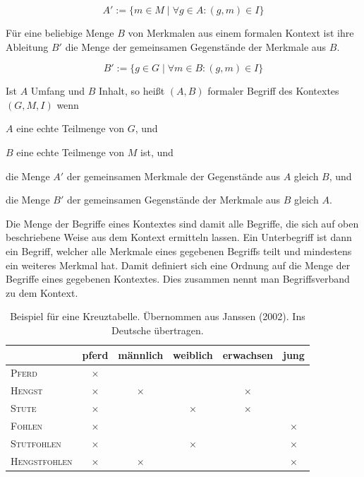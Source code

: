 \documentclass[pagesize,DIV=calc,12pt,final]{scrreprt}
\begin{document}
\begin{equation*}
A' := \lbrace m \in M \; \vert \; \forall g \in A: (g,m) \in I\rbrace
\end{equation*}

Für eine beliebige Menge $B$ von Merkmalen aus einem formalen Kontext ist ihre Ableitung $B'$ die Menge der gemeinsamen Gegenstände der Merkmale aus $B$. 

\begin{equation*}
B' := \lbrace g \in G \; \vert \; \forall m \in B: (g,m) \in I\rbrace
\end{equation*}

Ist $A$ Umfang und $B$ Inhalt, so heißt $(A,B)$ formaler Begriff des Kontextes $(G,M,I)$ wenn

\begin{inparaenum}
\item
 $A$ eine echte Teilmenge von $G$, und
\item
 $B$ eine echte Teilmenge von $M$ ist, und
\item
 die Menge $A'$ der gemeinsamen Merkmale der Gegenstände aus $A$ gleich
 $B$, und
\item
 die Menge $B'$ der gemeinsamen Gegenstände der Merkmale aus $B$ gleich
 $A$.
\end{inparaenum}

Die Menge der Begriffe eines Kontextes sind damit alle Begriffe, die sich auf oben beschriebene Weise aus dem Kontext ermitteln lassen. 
Ein Unterbegriff ist dann ein Begriff, welcher alle Merkmale eines gegebenen Begriffs teilt und mindestens ein weiteres Merkmal hat. 
Damit definiert sich eine Ordnung auf die Menge der Begriffe eines gegebenen Kontextes. 
Dies zusammen nennt man Begriffsverband zu dem Kontext. 

\begin{table}[ht]
\label{tab:janssen}
\centering
\renewcommand{\arraystretch}{2}
\begin{tabular}{@{}lccccc@{}}
\toprule
&
pferd &
männlich &
weiblich &
erwachsen &
jung\\
\midrule
\textsc{Pferd}	&	$\times$	&&&&\\

\textsc{Hengst}	&	$\times$	&	$\times$	&&	$\times$	&\\

\textsc{Stute}	&	$\times$	&&	$\times$	&	$\times$	&\\

\textsc{Fohlen}	&	$\times$	&&&&	$\times$\\

\textsc{Stutfohlen}	&	$\times$	&&	$\times$	&&	$\times$\\

\textsc{Hengstfohlen}	&	$\times$	&	$\times$	&&&	$\times$\\
\bottomrule
\end{tabular}
\caption{Beispiel für eine Kreuztabelle. Übernommen aus Janssen (2002). Ins Deutsche übertragen.}
\end{table}
\end{document}
